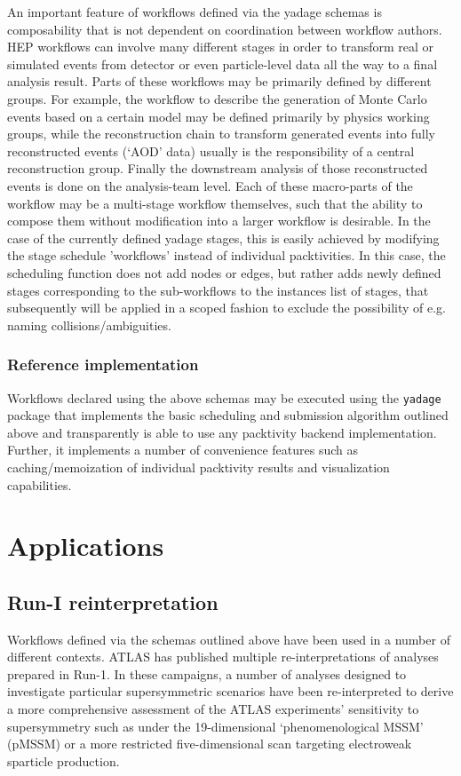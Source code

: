 \documentclass[a4paper]{jpconf}
\begin{document}
An important feature of workflows defined via the yadage schemas is composability that is not dependent on coordination between workflow authors. HEP workflows can involve many different stages in order to transform real or simulated events from detector or even particle-level data all the way to a final analysis result. Parts of these workflows may be primarily defined by different groups. For example, the workflow to describe the generation of Monte Carlo events based on a certain model may be defined primarily by physics working groups, while the reconstruction chain to transform generated events into fully reconstructed events (`AOD' data) usually is the responsibility of a central reconstruction group. Finally the downstream analysis of those reconstructed events is done on the analysis-team level. Each of these macro-parts of the workflow may be a multi-stage workflow themselves, such that the ability to compose them without modification into a larger workflow is desirable. In the case of the currently defined yadage stages, this is easily achieved by modifying the stage schedule 'workflows' instead of individual packtivities. In this case, the scheduling function does not add nodes or edges, but rather adds newly defined stages corresponding to the sub-workflows to the instances list of stages, that subsequently will be applied in a scoped fashion to exclude the possibility of e.g. naming collisions/ambiguities.

\subsubsection{Reference implementation}

Workflows declared using the above schemas may be executed using the \verb+yadage+ package\cite{yadage} that implements the basic scheduling and submission algorithm outlined above and transparently is able to use any packtivity backend implementation. Further, it implements a number of convenience features such as caching/memoization of individual packtivity results and visualization capabilities.  

\section{Applications}

\subsection{Run-I reinterpretation}
Workflows defined via the schemas outlined above have been used in a number of different contexts. ATLAS has published multiple re-interpretations of analyses prepared in Run-1. In these campaigns, a number of analyses designed to investigate particular supersymmetric scenarios have been re-interpreted to derive a more comprehensive assessment of the ATLAS experiments' sensitivity to supersymmetry such as under the 19-dimensional `phenomenological MSSM' (pMSSM) or a more restricted five-dimensional scan targeting electroweak sparticle production\cite{Aad:2015baa,Aaboud:2016wna,ATLAS-CONF-2016-033}.
\end{document}
